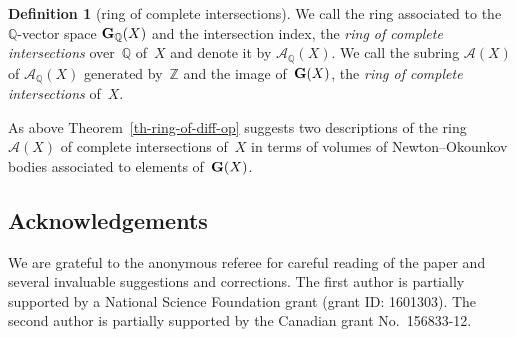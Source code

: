 \documentclass[pdftex]{sigma}
\def \Z{\mathbb{Z}}
\def \Q{\mathbb{Q}}
\def \A{\mathcal{A}}
\def \G{{\bf G}}
\numberwithin{equation}{section}
\theoremstyle{definition}
\newtheorem{Def}[Th]{Definition}
\begin{document}
\begin{Def}[ring of complete intersections] \label{def-ring-of-complete-intersec-general}
We call the ring associated to the $\Q$-vector space $\G_\Q(X)$ and the intersection index, the {\it ring of complete intersections} over~$\Q$ of~$X$ and denote it by $\A_\Q(X)$. We call the subring $\A(X)$ of $\A_\Q(X)$ generated by~$\Z$ and the image of~$\G(X)$, the {\it ring of complete intersections} of~$X$.
\end{Def}

As above Theorem~\ref{th-ring-of-diff-op} suggests two descriptions of the ring $\A(X)$ of complete intersections of~$X$ in terms of volumes of Newton--Okounkov bodies associated to elements of~$\G(X)$.

\subsection*{Acknowledgements}
We are grateful to the anonymous referee for careful reading of the paper and several invaluable suggestions and corrections. The first author is partially supported by a National Science Foundation grant (grant ID: 1601303). The second author is partially supported by the Canadian grant No.~156833-12.
\end{document}
